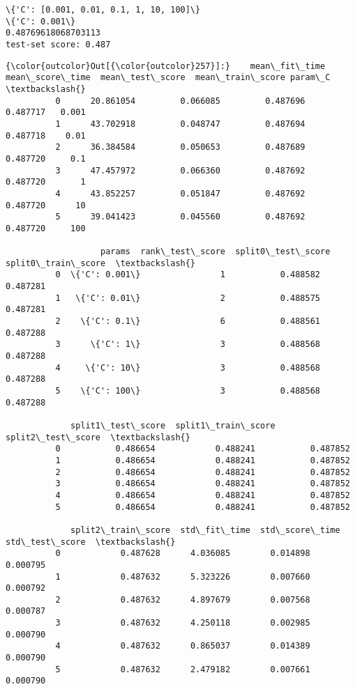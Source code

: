 \documentclass[11pt]{article}
\begin{document}
    \begin{Verbatim}[commandchars=\\\{\}]
\{'C': [0.001, 0.01, 0.1, 1, 10, 100]\}
\{'C': 0.001\}
0.48769618068703113
test-set score: 0.487

    \end{Verbatim}

            \begin{Verbatim}[commandchars=\\\{\}]
{\color{outcolor}Out[{\color{outcolor}257}]:}    mean\_fit\_time  mean\_score\_time  mean\_test\_score  mean\_train\_score param\_C  \textbackslash{}
          0      20.861054         0.066085         0.487696          0.487717   0.001   
          1      43.702918         0.048747         0.487694          0.487718    0.01   
          2      36.384584         0.050653         0.487689          0.487720     0.1   
          3      47.457972         0.066360         0.487692          0.487720       1   
          4      43.852257         0.051847         0.487692          0.487720      10   
          5      39.041423         0.045560         0.487692          0.487720     100   
          
                   params  rank\_test\_score  split0\_test\_score  split0\_train\_score  \textbackslash{}
          0  \{'C': 0.001\}                1           0.488582            0.487281   
          1   \{'C': 0.01\}                2           0.488575            0.487281   
          2    \{'C': 0.1\}                6           0.488561            0.487288   
          3      \{'C': 1\}                3           0.488568            0.487288   
          4     \{'C': 10\}                3           0.488568            0.487288   
          5    \{'C': 100\}                3           0.488568            0.487288   
          
             split1\_test\_score  split1\_train\_score  split2\_test\_score  \textbackslash{}
          0           0.486654            0.488241           0.487852   
          1           0.486654            0.488241           0.487852   
          2           0.486654            0.488241           0.487852   
          3           0.486654            0.488241           0.487852   
          4           0.486654            0.488241           0.487852   
          5           0.486654            0.488241           0.487852   
          
             split2\_train\_score  std\_fit\_time  std\_score\_time  std\_test\_score  \textbackslash{}
          0            0.487628      4.036085        0.014898        0.000795   
          1            0.487632      5.323226        0.007660        0.000792   
          2            0.487632      4.897679        0.007568        0.000787   
          3            0.487632      4.250118        0.002985        0.000790   
          4            0.487632      0.865037        0.014389        0.000790   
          5            0.487632      2.479182        0.007661        0.000790   
          

\end{Verbatim}
\end{document}
